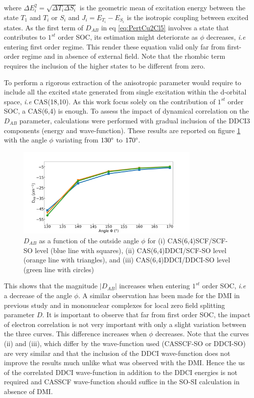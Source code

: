 \documentclass[10pt]{report}
\numberwithin{equation}{section}
\begin{document}
where $\Delta E^2_i=\sqrt{\Delta T_i \Delta S_i}$ is the geometric mean of excitation energy between the state $T_1$ and $T_i$ or $S_i$ and $J_i=E_{T_i}-E_{S_i}$ is the isotropic coupling between excited states.
As the first term of $D_{AB}$ in eq \ref{eq:PertCu2Cl5} involves a state that contributes to $1^{st}$ order SOC, its estimation might deteriorate as $\phi$ decreases, \textit{i.e} entering first order regime.
This render these equation valid only far from first-order regime and in absence of external field. Note that the rhombic term requires the inclusion of the higher states to be different from zero.

To perform a rigorous extraction of the anisotropic parameter would require to include all the excited state generated from single excitation within the d-orbital space, \textit{i.e} CAS(18,10).
As this work focus solely on the contribution of $1^{st}$ order SOC, a CAS(6,4) is enough. 
To assess the impact of dynamical correlation on the $D_{AB}$ parameter, calculations were performed with gradual inclusion of the DDCI3 components (energy and wave-function).
These results are reported on figure \ref{DABangle} with the angle $\phi$ variating from $130\degree$ to $170\degree$.

\begin{figure}[h!]
    \centering
    \includegraphics[width=0.8\textwidth]{Images/D_AB_Angle2.png}
    \caption{$D_{AB}$ as a function of the outside angle $\phi$ for (i) CAS(6,4)SCF/SCF-SO level (blue line with squares), (ii) CAS(6,4)DDCI/SCF-SO level (orange line with triangles), and (iii) CAS(6,4)DDCI/DDCI-SO level (green line with circles) }
    \label{DABangle}
\end{figure}

This shows that the magnitude $|D_{AB}|$ increases when entering $1^{st}$ order SOC, \textit{i.e} a decrease of the angle $\phi$.
A similar observation has been made for the DMI in previous study and in mononuclear complexes for local zero field splitting parameter $D$.
It is important to observe that far from first order SOC, the impact of electron correlation is not very important with only a slight variation between the three curves.
This difference increases when $\phi$ decreases.
Note that the curves (ii) and (iii), which differ by the wave-function used (CASSCF-SO or DDCI-SO) are very similar and that the inclusion of the DDCI wave-function does not improve the results much unlike what was observed with the DMI.
Hence the us of the correlated DDCI wave-function in addition to the DDCI energies is not required and CASSCF wave-function should suffice in the SO-SI calculation in absence of DMI. 
\end{document}
